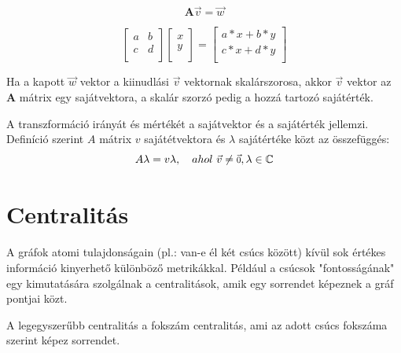 \documentclass[12pt,numbers=noenddot]{report}
\begin{document}
$$
\textbf{A} \vec{v} = \vec{w}
$$

$$
{
	\begin{bmatrix}
		a & b \\
		c & d \\
	\end{bmatrix}
}
{
	\begin{bmatrix}
		x \\
		y \\
	\end{bmatrix}
}
=
{
	\begin{bmatrix}
		a*x+b*y \\
		c*x+d*y \\
	\end{bmatrix}
}
$$

\vspace{1cm}

Ha a kapott $\vec{w}$ vektor a kiinudlási $\vec{v}$ vektornak skalárszorosa,
akkor $\vec{v}$ vektor az $\textbf{A}$ mátrix egy sajátvektora, a skalár szorzó
pedig a hozzá tartozó sajátérték.

A transzformáció irányát és mértékét a sajátvektor és a sajátérték jellemzi.
Definíció szerint $A$ mátrix $v$ sajátétvektora és $\lambda$ sajátértéke 
közt az összefüggés: 
$$
A \lambda = v \lambda, ~~~ ahol ~ \vec{v} \neq \vec{\scaleobj{.8}{0}}, \lambda \in \mathbb{C}
$$


\section{Centralitás}
A gráfok atomi tulajdonságain (pl.: van-e él két csúcs között) kívül sok 
értékes információ kinyerhető különböző metrikákkal. Például a csúcsok 
"fontosságának" egy kimutatására szolgálnak a centralitások, amik egy sorrendet 
képeznek a gráf pontjai közt. \cite{centrality-def}

A legegyszerűbb centralitás a fokszám centralitás, ami az adott csúcs fokszáma 
szerint képez sorrendet.
\end{document}
